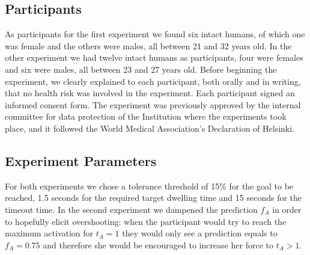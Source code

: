 \subsection{Participants}\label{subsec:exp-participants}
As participants for the first experiment we found six intact humans, of which one was female and the others were males, all between 21 and 32 years old. In the other experiment we had twelve intact humans as participants, four were females and six were males, all between 23 and 27 years old. Before beginning the experiment, we clearly explained to each participant, both orally and in writing, that no health risk was involved in the experiment.  Each participant signed an informed consent form. The experiment was previously approved by the internal committee for data protection of the Institution where the experiments took place, and it followed the World Medical Association’s Declaration of Helsinki.
\subsection{Experiment Parameters}\label{subsec:exp-parameters}
For both experiments we chose a tolerance threshold of 15\% for the goal to be reached, 1.5 seconds for the required target dwelling time and 15 seconds for the timeout time. In the second experiment we dampened the prediction $f_A$ in order to hopefully elicit overshooting: when the participant would try to reach the maximum activation for $t_A = 1$ they would only see a prediction equals to $f_A = 0.75$ and therefore she would be encouraged to increase her force to $t_A > 1$.  
